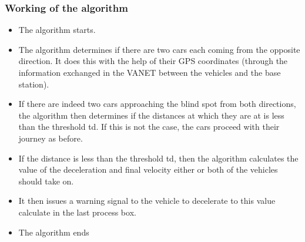 \documentclass[12pt]{report}
\begin{document}
\subsubsection{Working of the algorithm}
\begin{itemize}
	\item The algorithm starts.
	\item The algorithm determines if there are two cars each coming from the opposite direction. It does this with the help of their GPS coordinates (through the information exchanged in the VANET between the vehicles and the base station).
	\item If there are indeed two cars approaching the blind spot from both directions, the algorithm then determines if the distances at which they are at is less than the threshold td. If this is not the case, the cars proceed with their journey as before.
	\item If the distance is less than the threshold td, then the algorithm calculates the value of the deceleration and final velocity either or both of the vehicles should take on. 
	\item It then issues a warning signal to the vehicle to  decelerate to this value calculate in the last process box.
	\item The algorithm ends
\end{itemize}
\end{document}
